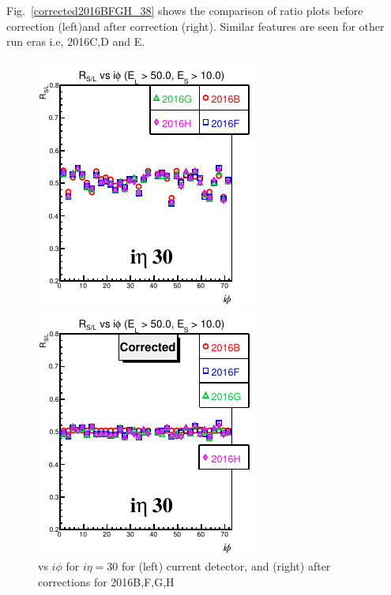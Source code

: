 Fig.~\ref{corrected2016BFGH_38} shows the comparison of ratio plots before correction (left)and after correction (right). Similar features are seen for other run eras i.e, 2016C,D and E. %

\begin{figure}[!h] %
\begin{minipage}[c]{0.5\linewidth}
\centering
\includegraphics[width=0.7\linewidth]{../Figures/Chap2/ImageFiles_HF/Ratio/2016/Corrected/ieta30Cut3Ietaiphi.pdf}
\end{minipage}
\begin{minipage}[c]{0.5\linewidth}
\centering
\includegraphics[width=0.7\linewidth]{../Figures/Chap2/ImageFiles_HF/Ratio/2016/Corrected/ieta30Cut3Ietaiphi_corr.pdf}
\end{minipage}
\caption{\ratiosl vs $i\phi$ for $i\eta=$30 for (left) current detector, and (right) after corrections for 2016B,F,G,H}
\label{corrected2016BFGH_30}
\end{figure}

